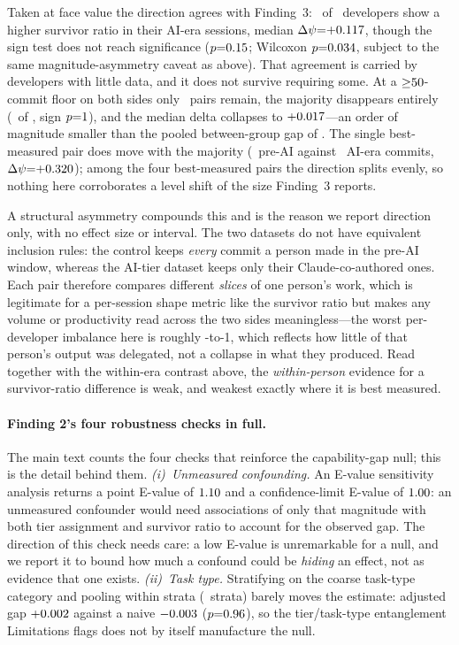 Taken at face value the direction agrees with Finding~3: \statPCPairedHigher\ of \statPCPairedPairs\ developers show a higher survivor ratio in their AI-era sessions, median $\Delta\psi{=}{+}0.117$, though the sign test does not reach significance ($p{=}0.15$; Wilcoxon $p{=}0.034$, subject to the same magnitude-asymmetry caveat as above). That agreement is carried by developers with little data, and it does not survive requiring some. At a ${\ge}50$-commit floor on both sides only \statPCPairedFDPairs\ pairs remain, the majority disappears entirely (\statPCPairedFDHigher\ of \statPCPairedFDPairs, sign $p{=}1$), and the median delta collapses to ${+}0.017$---an order of magnitude smaller than the pooled between-group gap of \statPCCtrlGapOpus. The single best-measured pair does move with the majority (\statPCPairedTopVolCtrl\ pre-AI against \statPCPairedTopVolAI\ AI-era commits, $\Delta\psi{=}{+}0.320$); among the four best-measured pairs the direction splits evenly, so nothing here corroborates a level shift of the size Finding~3 reports.

A structural asymmetry compounds this and is the reason we report direction only, with no effect size or interval. The two datasets do not have equivalent inclusion rules: the control keeps \emph{every} commit a person made in the pre-AI window, whereas the AI-tier dataset keeps only their Claude-co-authored ones. Each pair therefore compares different \emph{slices} of one person's work, which is legitimate for a per-session shape metric like the survivor ratio but makes any volume or productivity read across the two sides meaningless---the worst per-developer imbalance here is roughly \statPCPairedMaxRatio-to-1, which reflects how little of that person's output was delegated, not a collapse in what they produced. Read together with the within-era contrast above, the \emph{within-person} evidence for a survivor-ratio difference is weak, and weakest exactly where it is best measured.

\paragraph{Finding 2's four robustness checks in full.} The main text counts the four checks that reinforce the capability-gap null; this is the detail behind them. \emph{(i)~Unmeasured confounding.} An E-value sensitivity analysis \citep{vanderweele2017evalue} returns a point E-value of $1.10$ and a confidence-limit E-value of $1.00$: an unmeasured confounder would need associations of only that magnitude with both tier assignment and survivor ratio to account for the observed gap. The direction of this check needs care: a low E-value is unremarkable for a null, and we report it to bound how much a confound could be \emph{hiding} an effect, not as evidence that one exists. \emph{(ii)~Task type.} Stratifying on the coarse task-type category and pooling within strata (\statPCStrata\ strata) barely moves the estimate: adjusted gap ${+}0.002$ against a naive ${-}0.003$ ($p{=}0.96$), so the tier/task-type entanglement Limitations flags does not by itself manufacture the null.

